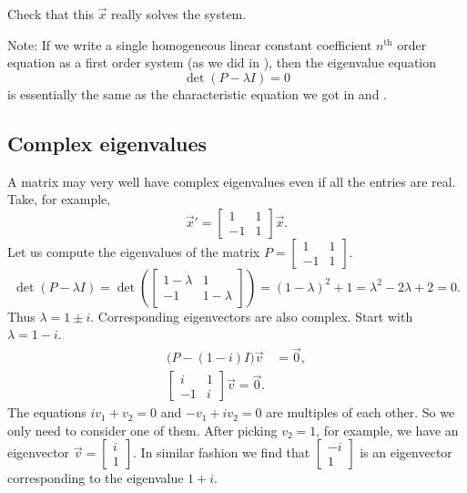 \begin{exercise}
Check that this $\vec{x}$ really solves the system.
\end{exercise}

Note: If we write a single homogeneous linear constant coefficient $n^{\text{th}}$
order equation as a first order system (as we did in ),
then the eigenvalue equation
\begin{equation*}
\det(P - \lambda I) = 0
\end{equation*}
is essentially the same as the characteristic equation we got in
 and .




\subsection{Complex eigenvalues}

A matrix may very well have complex eigenvalues even if all the entries are
real.  Take, for example,
\begin{equation*}
{\vec{x}}' = 
\begin{bmatrix}
1 & 1 \\
-1 & 1
\end{bmatrix}
\vec{x} .
\end{equation*}
Let us compute the eigenvalues of
the matrix $P = \left[ \begin{smallmatrix} 1 & 1 \\ -1 & 1 \end{smallmatrix}
\right]$.
\begin{equation*}
\det(P - \lambda I) =
\det\left(
\begin{bmatrix}
1-\lambda & 1 \\
-1 & 1-\lambda
\end{bmatrix}
\right)
= {(1-\lambda)}^2 + 1
= \lambda^2 - 2 \lambda + 2 = 0 .
\end{equation*}
Thus $\lambda = 1 \pm i$.
Corresponding eigenvectors are also complex.
Start with $\lambda = 1-i$.
\begin{align*}
\bigl(P-(1-i) I\bigr) \vec{v} & = \vec{0} , \\
\begin{bmatrix}
i & 1 \\
-1 & i
\end{bmatrix}
\vec{v} = \vec{0}.
\end{align*}
The equations $i v_1 + v_2 = 0$ and $-v_1 + iv_2 = 0$
are multiples of each other.  So we only need to consider one of them.
After picking $v_2 = 1$, for example, we have an
eigenvector
$\vec{v} = \left[ \begin{smallmatrix} i \\ 1 \end{smallmatrix} \right]$.
In similar fashion we find that
$\left[ \begin{smallmatrix} -i \\ 1 \end{smallmatrix} \right]$
is an eigenvector corresponding to the eigenvalue $1+i$.

